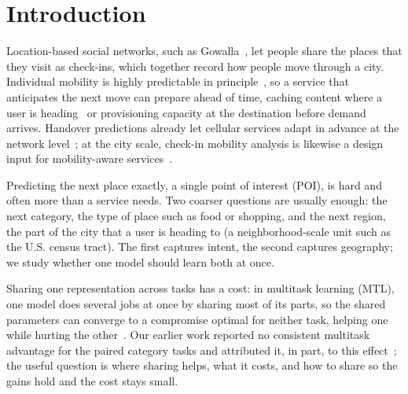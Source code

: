 \section{Introduction}
\label{sec:mobiwac:intro}

Location-based social networks, such as Gowalla~\cite{cho2011gowalla}, let people share the places that they visit as check-ins, which together record how people move through a city. Individual mobility is highly predictable in principle~\cite{song2010limits}, so a service that anticipates the next move can prepare ahead of time, caching content where a user is heading~\cite{bastug2014edge} or provisioning capacity at the destination before demand arrives. Handover predictions already let cellular services adapt in advance at the network level~\cite{vielhaus2022handover}; at the city scale, check-in mobility analysis is likewise a design input for mobility-aware services~\cite{moura2025mobilityaware}.

Predicting the next place exactly, a single point of interest (POI), is hard and often more than a service needs. Two coarser questions are usually enough: the next category, the type of place such as food or shopping, and the next region, the part of the city that a user is heading to (a neighborhood-scale unit such as the U.S. census tract). The first captures intent, the second captures geography; we study whether one model should learn both at once.

Sharing one representation across tasks has a cost: in multitask learning (MTL), one model does several jobs at once by sharing most of its parts, so the shared parameters can converge to a compromise optimal for neither task, helping one while hurting the other~\cite{caruana1997multitask}. Our earlier
work reported no consistent multitask advantage for the paired category tasks and attributed it, in part, to this effect~\cite{silva2025mtlnet}; the useful question is where sharing helps, what it costs, and how to share so the gains hold and the cost stays small.

